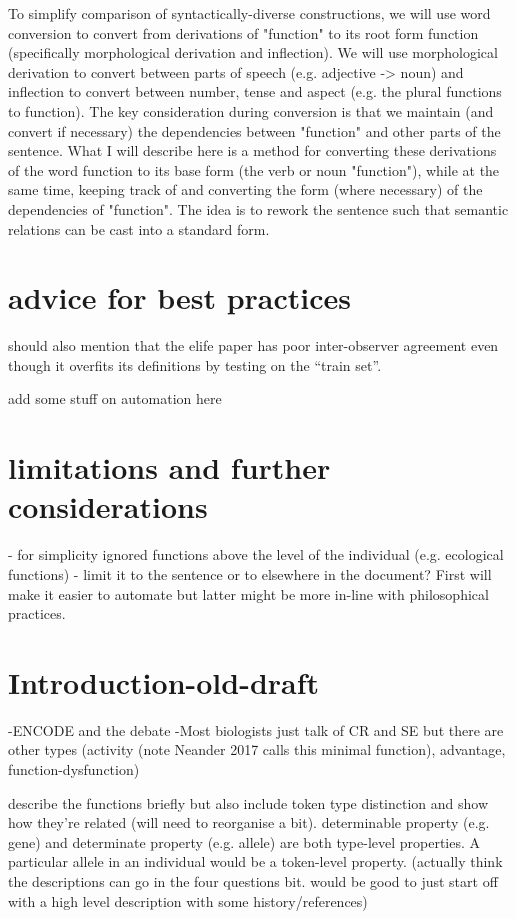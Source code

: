 \documentclass{article}
\begin{document}
To simplify comparison of syntactically-diverse constructions, we will use word conversion to convert from derivations of "function" to its root form function (specifically morphological derivation and inflection). We will use morphological derivation to convert between parts of speech (e.g. adjective -> noun) and inflection to convert between number, tense and aspect (e.g. the plural functions to function). The key consideration during conversion is that we maintain (and convert if necessary) the dependencies between "function" and other parts of the sentence. What I will describe here is a method for converting these derivations of the word function to its base form (the verb or noun "function"), while at the same time, keeping track of and converting the form (where necessary) of the dependencies of "function". The idea is to rework the sentence such that semantic relations can be cast into a standard form.



\section{advice for best practices}
\label{sec:advice-best-pract}

should also mention that the elife paper has poor inter-observer agreement even though it overfits its definitions by testing on the ``train set''.

add some stuff on automation here

\section{limitations and further considerations}
\label{sec:limitations}

- for simplicity ignored functions above the level of the individual (e.g. ecological functions)
- limit it to the sentence or to elsewhere in the document? First will make it easier to automate but latter might be more in-line with philosophical practices.

\section{Introduction-old-draft}
\label{sec:introduction-1}

-ENCODE and the debate
-Most biologists just talk of CR and SE but there are other types (activity (note Neander 2017 calls this minimal function), advantage, function-dysfunction)

describe the functions briefly but also include token type distinction and show how they're related (will need to reorganise a bit). determinable property (e.g. gene) and determinate property (e.g. allele) are both type-level properties. A particular allele in an individual would be a token-level property. (actually think the descriptions can go in the four questions bit. would be good to just start off with a high level description with some history/references)
\end{document}
